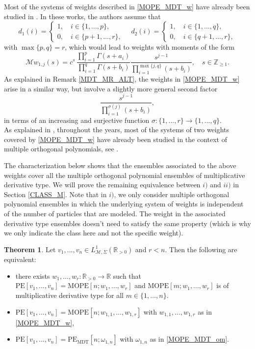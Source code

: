 \documentclass[a4paper,12pt,oneside]{article}
\theoremstyle{definition}
\newtheorem{thm}[defi]{Theorem}
\newcommand{\Z}{\mathbb{Z}}
\newcommand{\R}{\mathbb{R}}
\newcommand{\om}{\omega}
\newcommand{\MT}[1]{\mathcal{M}#1}
\begin{document}
Most of the systems of weights described in \eqref{MOPE_MDT_w} have already been studied in \cite{L:MOP_HG,Wolfs}. In these works, the authors assume that
$$ d_1(i) = \begin{cases}
    1,\quad i\in\{1,\dots,p\}, \\
    0, \quad i\in\{p+1,\dots,r\},
\end{cases}\quad 
d_2(i) = \begin{cases}
    1,\quad i\in\{1,\dots,q\}, \\
    0, \quad i\in\{q+1,\dots,r\},
\end{cases} $$
with $\max\{p,q\}=r$, which would lead to weights with moments of the form
    $$\MT{w_{1,j}}(s) = c^s \, \frac{\prod_{i=1}^p \Gamma(s+a_i)}{\prod_{i=1}^q \Gamma(s+b_i)} \frac{s^{j-1}}{\prod_{i=1}^{\max\{j,q\}} (s+b_i)},\quad s\in \Z_{\geq 1}.$$
As explained in Remark \ref{MDT_MR_ALT}, the weights in \eqref{MOPE_MDT_w} arise in a similar way, but involve a slightly more general second factor  
$$\frac{s^{j-1}}{\prod_{i=1}^{\sigma(j)} (s+b_i)},$$
in terms of an increasing and surjective function $\sigma:\{1,\dots,r\}\to\{1,\dots,q\}$. \\
As explained in \cite{L:MOP_HG,Wolfs}, throughout the years, most of the systems of two weights covered by \eqref{MOPE_MDT_w} have already been studied in the context of multiple orthogonal polynomials, see \cite{VAYakubovich,KZ:prod_gin,SmetVA,LimaLoureiro1,LimaLoureiro2,VAWolfs}.
\medbreak

The characterization below shows that the ensembles associated to the above weights cover all the multiple orthogonal polynomial ensembles of multiplicative derivative type. We will prove the remaining equivalence between $i)$ and $ii)$ in Section \ref{CLASS_M}. Note that in $i)$, we only consider multiple orthogonal polynomial ensembles in which the underlying system of weights is independent of the number of particles that are modeled. The weight in the associated derivative type ensembles doesn't need to satisfy the same property (which is why we only indicate the class here and not the specific weight). 

\begin{thm} \label{MOPE_MDT}
    Let $v_1,\dots,v_n\in L^{1}_{\MT{},\Sigma}(\R_{>0})$ and $r<n$. Then the following are equivalent:
    \begin{itemize}
        \item[$i)$] there exists $w_1,\dots,w_r:\R_{>0}\to\R$ such that $\text{PE}[v_1,\dots,v_n]=\text{MOPE}[n;w_1,\dots,w_r]$ and $\text{MOPE}[m;w_1,\dots,w_r]$ is of multiplicative derivative type for all $m\in\{1,\dots,n\}$.
        \item [$ii)$] $\text{PE}[v_1,\dots,v_n]=\text{MOPE}[n;w_{1,1},\dots,w_{1,r}]$ with $w_{1,1},\dots,w_{1,r}$ as in \eqref{MOPE_MDT_w},
        \item [$iii)$] $\text{PE}[v_1,\dots,v_n]=\text{PE}_{\text{MDT}}[n;\om_{1,n}]$ with $\om_{1,n}$ as in \eqref{MOPE_MDT_om}.
    \end{itemize}
\end{thm}
\end{document}

